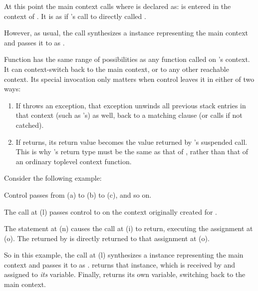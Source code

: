 At this point the main context calls 
where  is declared as:
\newline
{}
\newline
{} is entered in the context of . It is as if 's call
to  directly called .

However, as usual, the  call synthesizes a \ectx
instance representing the main context and passes it to 
as .

Function  has the same range of possibilities as any function called
on 's context. It can context-switch back to the main context, or to
any other reachable context. Its special invocation only matters when control
leaves it in either of two ways:

\begin{enumerate}
  \item If  throws an exception, that exception unwinds all previous
  stack entries in that context (such as 's) as well, back to a
  matching  clause (or calls  if not catched).
  \item If  returns, its return value becomes the value returned
  by 's suspended  call. This is
  why 's return type must be the same as that of \op, rather than
  that of an ordinary toplevel context function.
\end{enumerate}

Consider the following example:


Control passes from (a) to (b) to (c), and so on.

The  call at (l) passes control
to  on the context originally created for .

The  statement at (n) causes the \op call at (i) to return,
executing the assignment at (o). The  returned by 
is directly returned to that assignment at (o).

So in this example, the call at (l) synthesizes a \ectx instance representing
the main context and passes it to  as .  returns
that  instance, which is received by  and assigned
to \emph{its}  variable. Finally,  returns its
own  variable, switching back to the main context.


